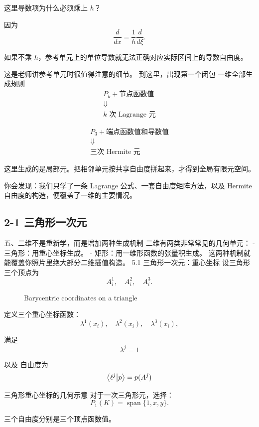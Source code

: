 这里导数项为什么必须乘上 \(h\)？

因为
\[
    \frac{d}{dx}=\frac1h\frac{d}{d\xi}.
\]

如果不乘 \(h\)，参考单元上的单位导数就无法正确对应实际区间上的导数自由度。

这是老师讲参考单元时很值得注意的细节。
到这里，出现第一个闭包
一维全部生成规则
\[
    \boxed{
        \begin{array}{c}
            P_k+\text{节点函数值} \\
            \Downarrow       \\
            k\text{ 次 Lagrange 元}
        \end{array}
    }
\]

\[
    \boxed{
        \begin{array}{c}
            P_3+\text{端点函数值和导数值} \\
            \Downarrow           \\
            \text{三次 Hermite 元}
        \end{array}
    }
\]

这里生成的是局部元。把相邻单元按共享自由度拼起来，才得到全局有限元空间。

你会发现：我们只学了一条 Lagrange 公式、一套自由度矩阵方法，以及 Hermite 自由度的构造，便覆盖了一维的主要情况。


\subsection{2-1 三角形一次元}
五、二维不是重新学，而是增加两种生成机制
二维有两类非常常见的几何单元：
- 三角形：用重心坐标生成。
- 矩形：用一维形函数的张量积生成。
这两种机制就能覆盖你照片里绝大部分二维插值构造。
5.1 三角形一次元：重心坐标
设三角形三个顶点为
\[
    A^1_i,\quad A^2_i,\quad A^3_i.
\]
\begin{figure}[htbp]
    \centering
    
    \caption{Barycentric coordinates on a triangle}
\end{figure}


定义三个重心坐标函数：
\[
    \lambda^1(x_i),\quad
    \lambda^2(x_i),\quad
    \lambda^3(x_i),
\]

满足
\[
    \lambda^j=1
\]

以及
自由度为
\[
    \braket{\ell^j}{p}=p(A^j)
\]


三角形重心坐标的几何示意
对于一次三角形元，选择：
\[
    P_1(K)=\operatorname{span}\{1,x,y\}.
\]

三个自由度分别是三个顶点函数值。

